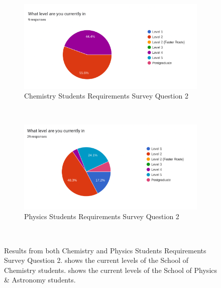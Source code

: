 \documentclass{l4proj}
\begin{document}
\begin{figure}[h]
    \centering
    \begin{subfigure}[b]{0.6\textwidth}
        \includegraphics[width=\textwidth]{images/levelsChem.pdf}
        \caption{Chemistry Students Requirements Survey Question 2}
        \label{fig:syn1}
    \end{subfigure}
    ~ %
    \begin{subfigure}[b]{0.6\textwidth}
        \includegraphics[width=\textwidth]{images/levelsPhys.pdf}
        \caption{Physics Students Requirements Survey Question 2}
        \label{fig:syn2}
    \end{subfigure}
    ~ %
    \caption{Results from both Chemistry and Physics Students Requirements Survey Question 2.  shows the current levels of the School of Chemistry students.  shows the current levels of the School of Physics \& Astronomy students.
    }\label{fig:levels}
\end{figure}
\end{document}
